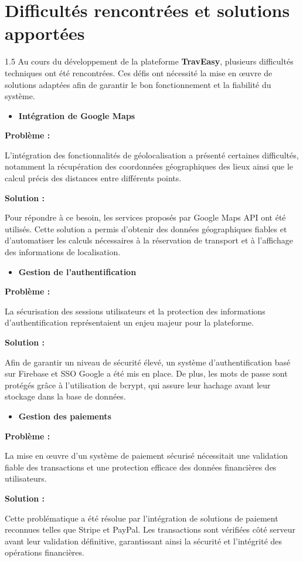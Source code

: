 \documentclass[a4paper,12pt]{report}
\begin{document}
\section{Difficultés rencontrées et solutions apportées}
\vspace{0.5cm}
\begin{spacing}{1.5}
\justifying
Au cours du développement de la plateforme \textbf{TravEasy}, plusieurs difficultés techniques ont été rencontrées. Ces défis ont nécessité la mise en œuvre de solutions adaptées afin de garantir le bon fonctionnement et la fiabilité du système.
\begin{itemize}
    \item \textbf{Intégration de Google Maps}
\end{itemize}

\textbf{Problème :}

L'intégration des fonctionnalités de géolocalisation a présenté certaines difficultés, notamment la récupération des coordonnées géographiques des lieux ainsi que le calcul précis des distances entre différents points.

\textbf{Solution :}

Pour répondre à ce besoin, les services proposés par Google Maps API ont été utilisés. Cette solution a permis d'obtenir des données géographiques fiables et d'automatiser les calculs nécessaires à la réservation de transport et à l'affichage des informations de localisation.

\begin{itemize}
    \item \textbf{Gestion de l'authentification}
\end{itemize}

\textbf{Problème :}

La sécurisation des sessions utilisateurs et la protection des informations d'authentification représentaient un enjeu majeur pour la plateforme.

\textbf{Solution :}

Afin de garantir un niveau de sécurité élevé, un système d'authentification basé sur Firebase et SSO Google a été mis en place. De plus, les mots de passe sont protégés grâce à l'utilisation de bcrypt, qui assure leur hachage avant leur stockage dans la base de données.


\begin{itemize}
    \item \textbf{Gestion des paiements}
\end{itemize}

\textbf{Problème :}

La mise en œuvre d'un système de paiement sécurisé nécessitait une validation fiable des transactions et une protection efficace des données financières des utilisateurs.

\textbf{Solution :}

Cette problématique a été résolue par l'intégration de solutions de paiement reconnues telles que Stripe et PayPal. Les transactions sont vérifiées côté serveur avant leur validation définitive, garantissant ainsi la sécurité et l'intégrité des opérations financières.



\end{spacing}
\end{document}
